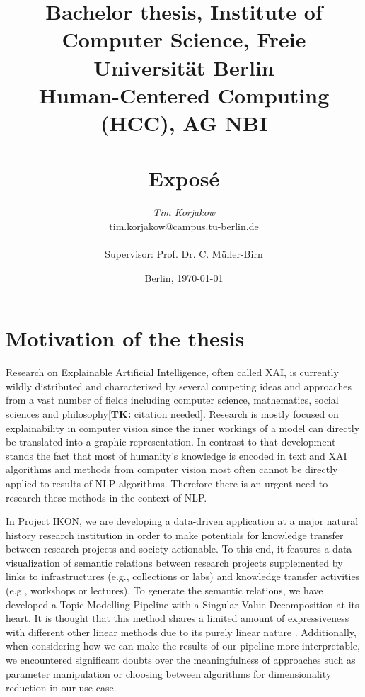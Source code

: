 \documentclass[pdftex,a4paper,12pt]{scrartcl}
\title{
{\small Bachelor thesis, Institute of Computer Science, Freie Universität Berlin}\\
{\small Human-Centered Computing (HCC), AG NBI}\\
[6ex]
{\LARGE<Titel der Arbeit>}\\
{\normalsize-- Exposé --}}
\author{
{\emph{\normalsize Tim Korjakow}}\\
{\normalsize tim.korjakow@campus.tu-berlin.de}\\\\
{\normalsize Supervisor: Prof. Dr. C. Müller-Birn}
}
\date{\normalsize Berlin, \today}
\newcommand{\tk}[1]{\textcolor{tim}{[\textbf{TK:} #1]}}
\newcommand{\blankpage}{
\newpage
\thispagestyle{empty}
\mbox{}
\newpage
}
\begin{document}
\maketitle 

\thispagestyle{empty}  %

\blankpage


\setcounter{page}{1} %

\section{Motivation of the thesis} 

Research on Explainable Artificial Intelligence, often called XAI, is currently wildly distributed and characterized by several competing ideas and approaches from a vast number of fields including computer science, mathematics, social sciences and philosophy\tk{citation needed}. Research is mostly focused on explainability in computer vision since the inner workings of a model can directly be translated into a graphic representation. In contrast to that development stands the fact that most of humanity's knowledge is encoded in text and XAI algorithms and methods from computer vision most often cannot be directly applied to results of NLP algorithms. Therefore there is an urgent need to research these methods in the context of NLP.

In Project IKON, we are developing a data-driven application at a major natural history research institution in order to make potentials for knowledge transfer between research projects and society actionable. To this end, it features a data visualization of semantic relations between research projects supplemented by links to infrastructures (e.g., collections or labs) and knowledge transfer activities (e.g., workshops or lectures). To generate the semantic relations, we have developed a Topic Modelling Pipeline with a Singular Value Decomposition at its heart. It is thought that this method shares a limited amount of expressiveness with different other linear methods due to its purely linear nature \cite{arrasWhatRelevantText2017}. Additionally, when considering how we can make the results of our pipeline more interpretable, we encountered significant doubts over the meaningfulness of approaches such as parameter manipulation or choosing between algorithms for dimensionality reduction \cite{benjaminTransparencyMediationMeaning2018} in our use case.
\end{document}

